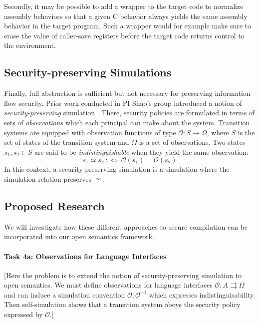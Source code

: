 Secondly,
it may be possible to add a wrapper to the target code
to normalize assembly behaviors
so that a given C behavior always yields
the same assembly behavior in the target program.
Such a wrapper would for example make sure
to erase the value of caller-save registers
before the target code returns control to the environment.

\subsection{Security-preserving Simulations}

Finally,
full abstraction is sufficient but not necessary
for preserving information-flow security.
Prior work conducted in PI Shao's group
introduced a notion of \emph{security-preserving} simulation
\cite{costanzo16}.
There,
security policies are formulated in terms
of sets of \emph{observations} 
which each principal can make about the system.
Transition systems are equipped with observation functions of type
$\mathcal{O} : S \rightarrow \Omega$,
where $S$ is the set of states of the transition system and
$\Omega$ is a set of observations.
Two states $s_1, s_2 \in S$
are said to be \emph{indistinguishable}
when they yield the same observation:
\[
  s_1 \simeq s_2 \::\Leftrightarrow\: \mathcal{O}(s_1) = \mathcal{O}(s_2)
\]
In this context,
a security-preserving simulation
is a simulation where
the simulation relation
preserves $\simeq$.

\subsection{Proposed Research}

We will investigate how these different approaches to secure compilation
can be incorporated into our open semantics framework.

\vspace*{-2ex}
\paragraph*{Task 4a: Observations for Language Interfaces}

[Here the problem is to extend the notion of security-preserving simulation
to open semantics. We must define observations for language interfaces
$\mathcal{O} : A \rightrightarrows \Omega$
and can induce a simulation convention $\mathcal{O} \mathbin; \mathcal{O}^{-1}$
which expresses indistinguisability.
Then self-simulation shows that a transition system
obeys the security policy expressed by $\mathcal{O}$.]

